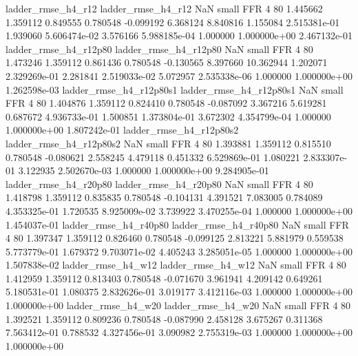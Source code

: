       ladder_rmse_h4_r12       ladder_rmse_h4_r12                   NaN      small      FFR                 4 80 1.445662       1.359112 0.849555       0.780548   -0.099192      6.368124      8.840816     1.155084   2.515381e-01  1.939060 5.606474e-02     3.576166   5.988185e-04            1.000000    1.000000e+00        2.467132e-01
   ladder_rmse_h4_r12p80    ladder_rmse_h4_r12p80                   NaN      small      FFR                 4 80 1.473246       1.359112 0.861436       0.780548   -0.130565      8.397660     10.362944     1.202071   2.329269e-01  2.281841 2.519033e-02     5.072957   2.535338e-06            1.000000    1.000000e+00        1.262598e-03
 ladder_rmse_h4_r12p80s1  ladder_rmse_h4_r12p80s1                   NaN      small      FFR                 4 80 1.404876       1.359112 0.824410       0.780548   -0.087092      3.367216      5.619281     0.687672   4.936733e-01  1.500851 1.373804e-01     3.672302   4.354799e-04            1.000000    1.000000e+00        1.807242e-01
 ladder_rmse_h4_r12p80s2  ladder_rmse_h4_r12p80s2                   NaN      small      FFR                 4 80 1.393881       1.359112 0.815510       0.780548   -0.080621      2.558245      4.479118     0.451332   6.529869e-01  1.080221 2.833307e-01     3.122935   2.502670e-03            1.000000    1.000000e+00        9.284905e-01
   ladder_rmse_h4_r20p80    ladder_rmse_h4_r20p80                   NaN      small      FFR                 4 80 1.418798       1.359112 0.835835       0.780548   -0.104131      4.391521      7.083005     0.784089   4.353325e-01  1.720535 8.925009e-02     3.739922   3.470255e-04            1.000000    1.000000e+00        1.454037e-01
   ladder_rmse_h4_r40p80    ladder_rmse_h4_r40p80                   NaN      small      FFR                 4 80 1.397347       1.359112 0.826460       0.780548   -0.099125      2.813221      5.881979     0.559538   5.773779e-01  1.679372 9.703071e-02     4.405243   3.285051e-05            1.000000    1.000000e+00        1.507838e-02
      ladder_rmse_h4_w12       ladder_rmse_h4_w12                   NaN      small      FFR                 4 80 1.412959       1.359112 0.813403       0.780548   -0.071670      3.961941      4.209142     0.649261   5.180531e-01  1.080375 2.832626e-01     3.019177   3.412116e-03            1.000000    1.000000e+00        1.000000e+00
      ladder_rmse_h4_w20       ladder_rmse_h4_w20                   NaN      small      FFR                 4 80 1.392521       1.359112 0.809236       0.780548   -0.087990      2.458128      3.675267     0.311368   7.563412e-01  0.788532 4.327456e-01     3.090982   2.755319e-03            1.000000    1.000000e+00        1.000000e+00
